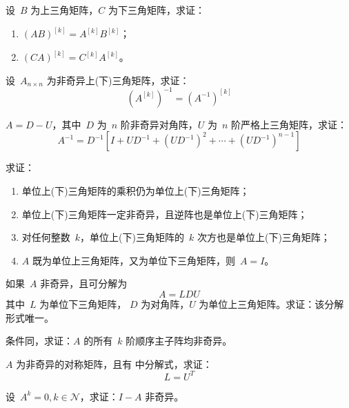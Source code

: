 \documentclass[twoside,openright]{book}
\begin{document}
\begin{CJK*}{UTF8}{}
\begin{quest}
\label{quest:48}
设\ $B$ 为上三角矩阵，$C$ 为下三角矩阵，求证：
\begin{enumerate}
\item
$(AB)^{[k]}=A^{[k]}B^{[k]}$；
\item
$(CA)^{[k]}=C^{[k]}A^{[k]}$。
\end{enumerate}
\end{quest}

\begin{quest}
\label{quest:49}
设\ $A_{n\times n}$ 为非奇异上(下)三角矩阵，求证：
\[
\left( A^{[k]} \right)^{-1}=\left( A^{-1} \right)^{[k]}
\]
\end{quest}

\begin{quest}
\label{quest:50}
$A=D-U$，其中\ $D$ 为\ $n$ 阶非奇异对角阵，$U$ 为\ $n$ 阶严格上三角矩阵，求证：
\[
A^{-1}=
D^{-1}
\left[
I+UD^{-1}+\left(UD^{-1}\right)^2+\dotsb+\left(UD^{-1}\right)^{n-1}
\right]
\]
\end{quest}

\begin{quest}
\label{quest:51}
求证：
\begin{enumerate}
\item
单位上(下)三角矩阵的乘积仍为单位上(下)三角矩阵；
\item
单位上(下)三角矩阵一定非奇异，且逆阵也是单位上(下)三角矩阵；
\item
对任何整数\ $k$，单位上(下)三角矩阵的\ $k$ 次方也是单位上(下)三角矩阵；
\item
$A$ 既为单位上三角矩阵，又为单位下三角矩阵，则\ $A=I$。
\end{enumerate}
\end{quest}

\begin{quest}
\label{quest:52}
如果\ $A$ 非奇异，且可分解为
\[
A=LDU
\]
其中\ $L$ 为单位下三角矩阵，
$D$ 为对角阵，$U$ 为单位上三角矩阵。求证：该分解形式唯一。
\end{quest}

\begin{quest}
\label{quest:53}
条件同{}，求证：$A$ 的所有\ $k$ 阶顺序主子阵均非奇异。
\end{quest}

\begin{quest}
\label{quest:54}
$A$ 为非奇异的对称矩阵，且有{} 中分解式，求证：
\[
L=U^T
\]
\end{quest}

\begin{quest}
\label{quest:55}
设\ $A^k=0,k\in\mathcal{N}$，求证：$I-A$ 非奇异。
\end{quest}


\end{CJK*}
\end{document}
